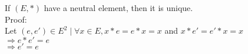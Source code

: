 \documentclass{article}
\begin{document}
\noindent If $(E, *)$ have a neutral element, then it is unique.\\

\noindent Proof:\\
Let $(e, e') \in E^2 \mid \forall x \in E, x * e = e * x
= x $ and $ x * e' = e' * x = x $\\
$\Rightarrow e * e' = e $\\
$\Rightarrow e' = e $\\
\end{document}
